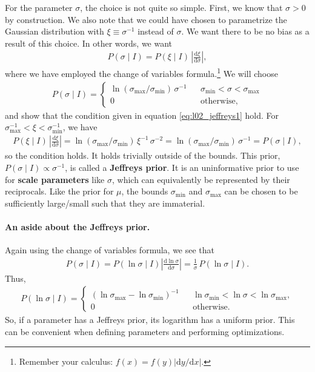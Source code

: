 For the parameter $\sigma$, the choice is not quite so simple.  First,
we know that $\sigma > 0$ by construction.  We also note that we could
have chosen to parametrize the Gaussian distribution with
$\xi \equiv \sigma^{-1}$ instead of $\sigma$.  We want there to be no
bias as a result of this choice.  In other words, we want
\begin{align}
P(\sigma\mid I) = P(\xi \mid I) \, \left|\frac{\mathrm{d}\xi}{\mathrm{d}\sigma}\right|,
\label{eq:l02_jeffreys1}
\end{align}
where we have employed the change of variables
formula.\footnote{Remember your calculus: $f(x) =
  f(y)\left|\mathrm{d}y/\mathrm{d}x\right|$.}  We will choose
\begin{align}
  P(\sigma \mid I) =  \left\{\begin{array}{ccl}
\ln(\sigma_\mathrm{max} / \sigma_\mathrm{min})\,\sigma^{-1} & & \sigma_\mathrm{min} < \sigma < \sigma_\mathrm{max}\\[1em]
0 & & \text{otherwise},
\end{array}\right.
\end{align}
and show that the condition given in equation \eqref{eq:l02_jeffreys1}
hold.  For $\sigma_\mathrm{max}^{-1} < \xi < \sigma_\mathrm{min}^{-1}$, we
have
\begin{align}
P(\xi \mid I) \, \left|\frac{\mathrm{d}\xi}{\mathrm{d}\sigma}\right|
= \ln(\sigma_\mathrm{max} / \sigma_\mathrm{min})\,\xi^{-1} \, \sigma^{-2}
=  \ln(\sigma_\mathrm{max} / \sigma_\mathrm{min})\,\sigma^{-1}
= P(\sigma\mid I),
\end{align}
so the condition holds.  It holds trivially outside of the bounds.
This prior, $P(\sigma\mid I) \propto \sigma^{-1}$, is called a
\textbf{Jeffreys prior}.  It is an uninformative prior to use for
\textbf{scale parameters} like $\sigma$, which can equivalently be
represented by their reciprocals.  Like the prior for $\mu$, the
bounds $\sigma_\mathrm{min}$ and $\sigma_\mathrm{max}$ can be chosen
to be sufficiently large/small such that they are immaterial.

\paragraph{An aside about the Jeffreys prior.} Again using the change
of variables formula, we see that
\begin{align}
P(\sigma \mid I) = P(\ln \sigma \mid I)\left|\frac{\mathrm{d}\ln \sigma}{\mathrm{d}\sigma}\right|
=  \frac{1}{\sigma}\, P(\ln \sigma \mid I).
\end{align}
Thus,
\begin{align}
P(\ln \sigma \mid I) = \left\{\begin{array}{ccl}
\left(\ln \sigma_\mathrm{max} - \ln \sigma_\mathrm{min}\right)^{-1} & & \ln \sigma_\mathrm{min} < \ln \sigma < \ln \sigma_\mathrm{max}, \\[1em]
0 & & \text{otherwise}.
\end{array}\right.
\end{align}
So, if a parameter has a Jeffreys prior, its logarithm has a uniform
prior.  This can be convenient when defining parameters and performing
optimizations.


